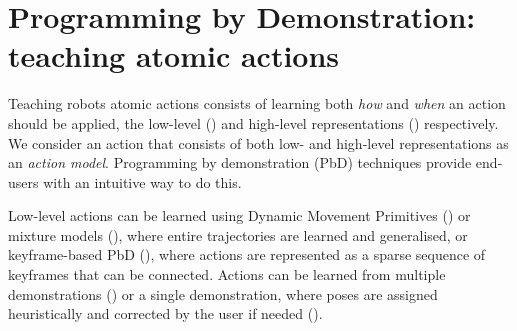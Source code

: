 \section{Programming by Demonstration: teaching atomic actions}
Teaching robots atomic actions consists of learning both \textit{how} and \textit{when} an action should be applied, \ie the low-level () and high-level representations () respectively.
We consider an action that consists of both low- and high-level representations as an \textit{action model}.
Programming by demonstration (PbD) techniques provide end-users with an intuitive way to do this. %

Low-level actions can be learned using Dynamic Movement Primitives (\cite{pastor2009learning}) or mixture models (\cite{calinon2007incremental}), where entire trajectories are learned and generalised, or keyframe-based PbD (\cite{akgun2012keyframe,alexandrova2014robot}), where actions are represented as a sparse sequence of keyframes that can be connected.
Actions can be learned from multiple demonstrations (\cite{niekum2012learning}) or a single demonstration, where poses are assigned heuristically and corrected by the user if needed (\cite{alexandrova2014robot}).

